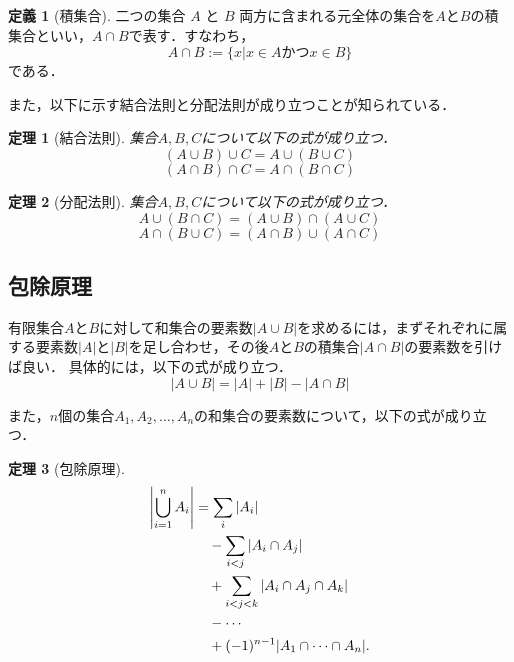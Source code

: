 \documentclass{jsreport}
\theoremstyle{plain} %
\newtheorem{theorem}{定理}
\theoremstyle{definition}
\newtheorem{definition}{定義}
\begin{document}
\begin{definition}[積集合]
    二つの集合 $A$ と $B$ 両方に含まれる元全体の集合を$A$と$B$の積集合といい，$A \cap B$で表す．すなわち，
    \begin{equation}
        A \cap B := \{x | x \in A かつ x \in B \}
    \end{equation}
    である．
\end{definition}

また，以下に示す結合法則と分配法則が成り立つことが知られている．
\begin{theorem}[結合法則]  集合$A, B, C$について以下の式が成り立つ．
    \begin{equation}
        (A \cup B) \cup C = A \cup (B \cup C)
    \end{equation}
    \begin{equation}
        (A \cap B) \cap C = A \cap (B \cap C)
    \end{equation}
\end{theorem}

\begin{theorem}[分配法則] 集合$A, B, C$について以下の式が成り立つ．
    \begin{equation}
        A \cup (B \cap C) = (A \cup B) \cap (A \cup C)
    \end{equation}
    \begin{equation}
        A \cap (B \cup C) = (A \cap B) \cup (A \cap C)
    \end{equation}
\end{theorem}

\subsection{包除原理}
有限集合$A$と$B$に対して和集合の要素数$|A \cup B|$を求めるには，まずそれぞれに属する要素数$|A|$と$|B|$を足し合わせ，その後$A$と$B$の積集合$|A \cap B|$の要素数を引けば良い．
具体的には，以下の式が成り立つ．
\begin{equation}
    |A \cup B| = |A| + |B| - |A \cap B|
\end{equation}

また，$n$個の集合$A_1, A_2, \ldots, A_n$の和集合の要素数について，以下の式が成り立つ．
\begin{theorem}[包除原理]
        \begin{align}
        \left| \bigcup_{i=1}^{n} A_i \right|
        &= \sum_i |A_i| \notag \\
        &\quad - \sum_{i < j} |A_i \cap A_j| \notag \\
        &\quad + \sum_{i < j < k} |A_i \cap A_j \cap A_k| \notag \\
        &\quad - \cdots \notag \\
        &\quad + (-1)^{n-1} |A_1 \cap \cdots \cap A_n|.
        \end{align}
\end{theorem}
\end{document}
